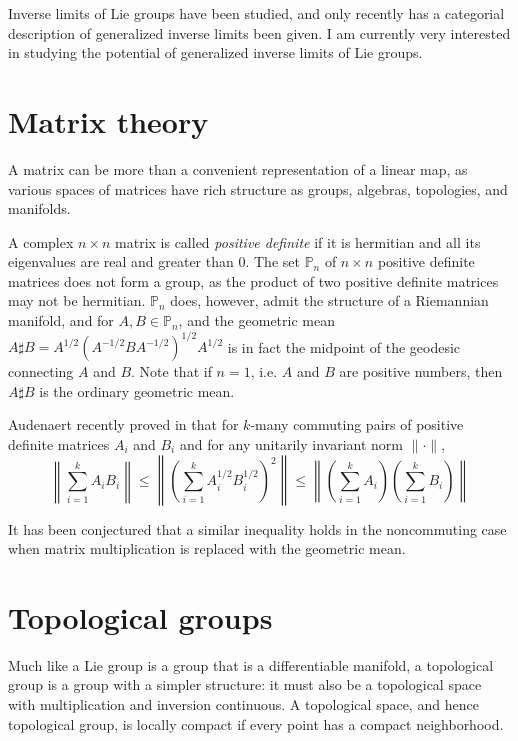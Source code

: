 \documentclass[11pt]{article}
\begin{document}
Inverse limits of Lie groups have been studied, and only recently has a
categorial description of generalized inverse limits been given. I am currently
very interested in studying the potential of generalized inverse limits of Lie
groups.

\section{Matrix theory}

A matrix can be more than a convenient representation of a linear map, as
various spaces of matrices have rich structure as groups, algebras, topologies,
and manifolds.

A complex \( n \times n \)
matrix is called \emph{positive definite} if it is hermitian and all its
eigenvalues are real and greater than $0$. The set \( \mathbb{P}_n \)
of \( n \times n \)
positive definite matrices does not form a group, as the product of two positive
definite matrices may not be hermitian. \( \mathbb{P}_n \)
does, however, admit the structure of a Riemannian manifold, and for
\( A,B \in \mathbb{P}_n \),
and the geometric mean
\( A \sharp B = A^{1/2}(A^{-1/2}BA^{-1/2})^{1/2}A^{1/2} \)
is in fact the midpoint of the geodesic connecting $A$ and $B$. Note that if \(
n = 1 \), i.e. $A$ and $B$ are positive numbers, then \( A \sharp B \) is the
ordinary geometric mean.

Audenaert recently proved in \cite{au15} that for $k$-many commuting pairs of
positive definite matrices \( A_i \) and \( B_i \) and for any unitarily
invariant norm \( \|\cdot\| \), \[ \left\| \sum_{i=1}^kA_iB_i\right\| \leq
  \left\|\left(\sum_{i=1}^kA_i^{1/2}B_i^{1/2}\right)^2\right\| \leq
  \left\|\left( \sum_{i=1}^kA_i \right)\left( \sum_{i=1}^kB_i\right)\right\| \]

It has been conjectured that a similar inequality holds in the noncommuting case
when matrix multiplication is replaced with the geometric mean.

\section{Topological groups}

Much like a Lie group is a group that is a differentiable manifold, a
topological group is a group with a simpler structure: it must also be a
topological space with multiplication and inversion continuous. A topological
space, and hence topological group, is locally compact if every point has a
compact neighborhood.
\end{document}
